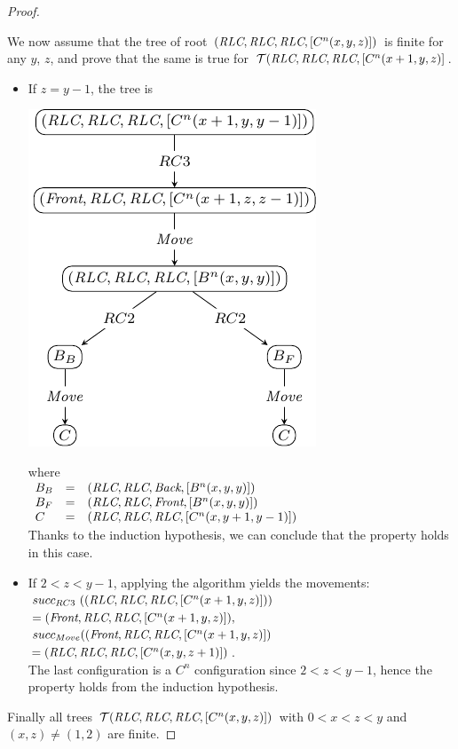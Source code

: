 \begin{proof}
\begin{description}[parsep=0cm, itemsep=0cm, topsep=0cm]
\item[{\bf Induction step:} ] We now assume that the tree of root
  $(\textit{RLC}, \textit{RLC}, \textit{RLC}, [C^n(x, y, z)])$ is finite
  for any $y$, $z$, and prove that the same is true for 
  $\mathcal{T}(\textit{RLC}, \textit{RLC}, \textit{RLC}, [C^n(x+1, y, z)]$.
\end{description}  
\begin{itemize}[parsep=0cm, itemsep=0cm, topsep=0cm]
\item If $z=y-1$, the tree is%
	\begin{center}
	\includegraphics[scale=1]{figures/figCrec1} 
	\end{center}
	where\\
 	$\begin{array}{l c l}
B_B & = &(\textit{RLC}, \textit{RLC}, \textit{Back}, [B^n(x, y, y)])\\
B_F & = &(\textit{RLC}, \textit{RLC}, \textit{Front}, [B^n(x, y, y)]) \\
C & = &(\textit{RLC}, \textit{RLC}, \textit{RLC}, [C^n(x, y+1, y-1)])
\end{array}$\\
 	Thanks to the induction hypothesis, we can conclude that
  	the property holds in this case.
\item If $2 < z < y - 1$, applying the algorithm yields the movements: \\ 
$succ_{RC3}~((\textit{RLC}, \textit{RLC}, \textit{RLC}, [C^n(x+1, y, z)]))$
$ = (\textit{Front}, \textit{RLC}, \textit{RLC}, [C^n(x+1, y, z)]), $\\ 
$ succ_{Move} (( \textit{Front}, \textit{RLC}, \textit{RLC}, [C^n(x+1, y, z)])$ 
$= (\textit{RLC}, \textit{RLC}, \textit{RLC}, [C^n(x, y, z+1)])$.\\
The last configuration is a $C^n$ configuration since $2<z<y-1$, hence
the property holds from the induction hypothesis.
\end {itemize}
Finally all trees
$\mathcal{T}(\textit{RLC}, \textit{RLC}, \textit{RLC}, [C^n(x, y, z)])$ with
$0<x<z<y$ and $(x, z) \neq (1, 2)$ are finite.
\end{proof}
